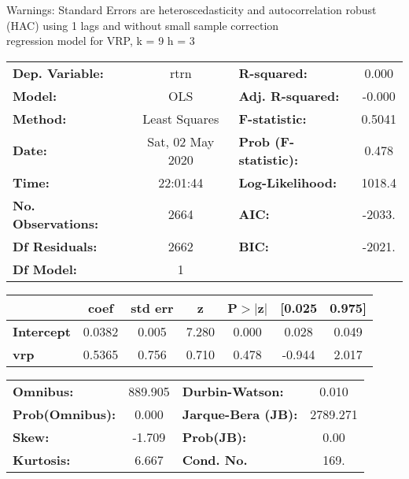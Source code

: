 Warnings: \newline
 [1] Standard Errors are heteroscedasticity and autocorrelation robust (HAC) using 1 lags and without small sample correction\\ 

regression model for VRP, k = 9 h = 3\begin{center}
\begin{tabular}{lclc}
\toprule
\textbf{Dep. Variable:}    &       rtrn       & \textbf{  R-squared:         } &     0.000   \\
\textbf{Model:}            &       OLS        & \textbf{  Adj. R-squared:    } &    -0.000   \\
\textbf{Method:}           &  Least Squares   & \textbf{  F-statistic:       } &    0.5041   \\
\textbf{Date:}             & Sat, 02 May 2020 & \textbf{  Prob (F-statistic):} &    0.478    \\
\textbf{Time:}             &     22:01:44     & \textbf{  Log-Likelihood:    } &    1018.4   \\
\textbf{No. Observations:} &        2664      & \textbf{  AIC:               } &    -2033.   \\
\textbf{Df Residuals:}     &        2662      & \textbf{  BIC:               } &    -2021.   \\
\textbf{Df Model:}         &           1      & \textbf{                     } &             \\
\bottomrule
\end{tabular}
\begin{tabular}{lcccccc}
                   & \textbf{coef} & \textbf{std err} & \textbf{z} & \textbf{P$> |$z$|$} & \textbf{[0.025} & \textbf{0.975]}  \\
\midrule
\textbf{Intercept} &       0.0382  &        0.005     &     7.280  &         0.000        &        0.028    &        0.049     \\
\textbf{vrp}       &       0.5365  &        0.756     &     0.710  &         0.478        &       -0.944    &        2.017     \\
\bottomrule
\end{tabular}
\begin{tabular}{lclc}
\textbf{Omnibus:}       & 889.905 & \textbf{  Durbin-Watson:     } &    0.010  \\
\textbf{Prob(Omnibus):} &   0.000 & \textbf{  Jarque-Bera (JB):  } & 2789.271  \\
\textbf{Skew:}          &  -1.709 & \textbf{  Prob(JB):          } &     0.00  \\
\textbf{Kurtosis:}      &   6.667 & \textbf{  Cond. No.          } &     169.  \\
\bottomrule
\end{tabular}
\end{center}

